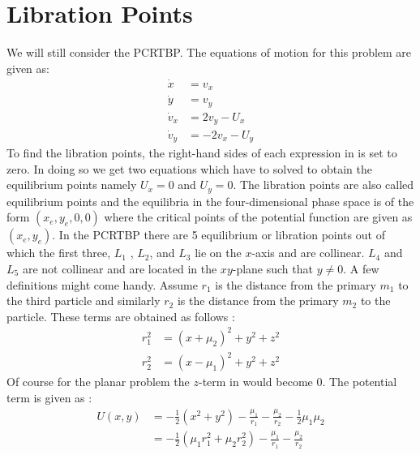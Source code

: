 \section{Libration Points}
We will still consider the \gls{PCRTBP}. The equations of motion for this problem are given as:
\begin{equation}
\label{planareom}
\begin{aligned}
\dot{x} &= v_x \\
\dot{y} &= v_y \\
\dot{v}_x &= 2v_y - U_x \\
\dot{v}_y &= -2v_x - U_y
\end{aligned}
\end{equation}
%
To find the libration points, the right-hand sides of each expression in  is set to zero. In doing so we get two equations which have to solved to obtain the equilibrium points namely $U_x = 0$ and $U_y = 0$. The libration points are also called equilibrium points and the equilibria in the four-dimensional phase space is of the form $(x_e,y_e,0,0)$ where the critical points of the potential function are given as $(x_e,y_e)$. In the \gls{PCRTBP} there are 5 equilibrium or libration points out of which the first three, $L_1$ , $L_2$, and $L_3$ lie on the $x$-axis and are collinear. $L_4$ and $L_5$ are not collinear and are located in the $xy$-plane such that $y\neq0$. A few definitions might come handy. Assume $r_1$ is the distance from the primary $m_1$ to the third particle and similarly $r_2$ is the distance from the primary $m_2$ to the particle. These terms are obtained as follows \cite{invariant}:
\begin{equation}
\label{r1r2}
\begin{aligned}
r_1^2 &= (x+\mu_2)^2 + y^2 + z^2 \\
r_2^2 &= (x - \mu_1)^2 + y^2 + z^2
\end{aligned}
\end{equation}
%
Of course for the planar problem the $z$-term in  would become 0. The potential term is given as \cite{invariant}:
\begin{equation}
\label{planarpot}
\begin{aligned}
U(x,y) &= -\frac{1}{2}(x^2 + y^2) - \frac{\mu_1}{r_1} - \frac{\mu_2}{r_2} - \frac{1}{2}\mu_1  \mu_2\\
&= -\frac{1}{2}(\mu_1 r_1^2 + \mu_2 r_2^2) - \frac{\mu_1}{r_1} - \frac{\mu_2}{r_2}
\end{aligned}
\end{equation}

